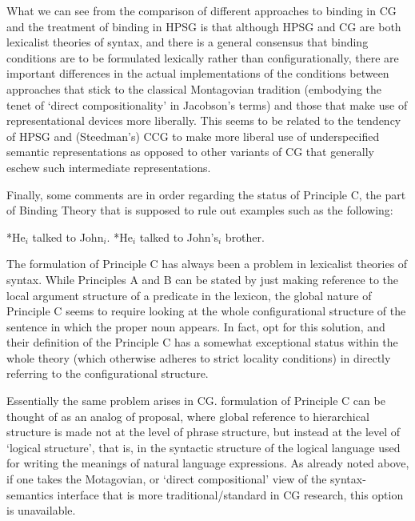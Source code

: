 \documentclass[output=paper]{langsci/langscibook}
\begin{document}
What we can see from the comparison of different approaches to binding
in CG and the treatment of binding in HPSG is that although HPSG and
CG are both lexicalist theories of syntax, and there is a general
consensus that binding conditions are to be formulated lexically
rather than configurationally, there are important differences in the
actual implementations of the conditions between approaches that stick to
the classical Montagovian tradition (embodying the tenet of `direct
compositionality' in Jacobson's terms) and those that make use of
representational devices more liberally. This seems to be related to
the tendency of HPSG and (Steedman's) CCG to make more liberal use of
underspecified semantic representations as opposed to other variants
of CG that generally eschew such intermediate representations.


Finally, some comments are in order regarding the status of
Principle C, the part of Binding Theory that is
supposed to rule out examples such as the following:

\begin{exe}
 \ex
  \begin{xlist}
 \ex
    *He\ensuremath{_i} talked to John\ensuremath{_i}.
 \ex
    *He\ensuremath{_i} talked to John's\ensuremath{_i} brother.
  \end{xlist}
\end{exe}

The formulation of Principle C has always been a problem in lexicalist
theories of syntax. While Principles A and
B can be stated by just making reference to the local argument
structure of a predicate in the lexicon, the global nature of
Principle C seems to require looking at the
whole configurational structure of the sentence
in which  the proper noun appears. In fact, \citet{ps2} opt for this
solution, and their definition of the Principle C
has a somewhat exceptional status within the whole theory
(which otherwise adheres to strict locality conditions)
in directly referring to the configurational structure. 

Essentially the same problem arises in CG.  formulation
of Principle C can be thought of as an analog of  proposal,
where global reference to hierarchical structure is made not at the
level of phrase structure, but instead at the level of `logical
structure', that is, in the syntactic structure of the logical
language used for writing the meanings of natural language
expressions. As already noted above, if one takes the Motagovian, or
`direct compositional' view of the syntax-semantics interface that is
more traditional/standard in CG research, this option is unavailable.
\end{document}
